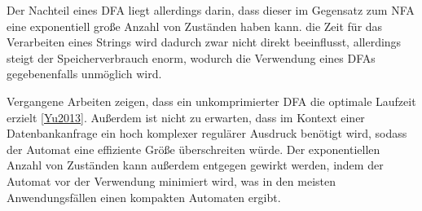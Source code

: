 Der Nachteil eines DFA liegt allerdings darin, dass dieser im Gegensatz zum NFA eine exponentiell große Anzahl von Zuständen haben kann.
die Zeit für das Verarbeiten eines Strings wird dadurch zwar nicht direkt beeinflusst, allerdings steigt der Speicherverbrauch enorm, wodurch die Verwendung eines DFAs gegebenenfalls unmöglich wird.

Vergangene Arbeiten zeigen, dass ein unkomprimierter DFA die optimale Laufzeit erzielt \ref{Yu2013}.
Außerdem ist nicht zu erwarten, dass im Kontext einer Datenbankanfrage ein hoch komplexer regulärer Ausdruck benötigt wird, sodass der Automat eine effiziente Größe überschreiten würde.
Der exponentiellen Anzahl von Zuständen kann außerdem entgegen gewirkt werden, indem der Automat vor der Verwendung minimiert wird, was in den meisten Anwendungsfällen einen kompakten Automaten ergibt.
